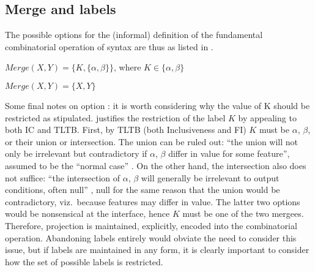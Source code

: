 \subsection{Merge and labels}\label{sec:250}

The possible options for the (informal) definition of the fundamental combinatorial operation of syntax are thus as listed in .

\begin{subexamples}\label{ex:twomerges}
    \item\label{ex:twomerges:label} $Merge(X,Y) = \{K,\{\alpha,\beta\}\}$, where $K\in\{\alpha,\beta\}$
    \item\label{ex:twomerges:nolabel} $Merge(X,Y) = \{X,Y\}$
\end{subexamples}

Some final notes on option : it is worth considering why the value of K should be restricted as stipulated. \textcite[4]{ChomskyN_1994} justifies the restriction of the label $K$ by appealing to both IC and TLTB. First, by TLTB (both Inclusiveness and FI) $K$ must be $\alpha$, $\beta$, or their union or intersection. The union can be ruled out: ``the union will not only be irrelevant but contradictory if $\alpha$, $\beta$ differ in value for some feature'', assumed to be the ``normal case'' \parencite[4]{ChomskyN_1994}. On the other hand, the intersection also does not suffice: ``the intersection of $\alpha$, $\beta$ will generally be irrelevant to output conditions, often null'' \parencite[4]{ChomskyN_1994}, null for the same reason that the union would be contradictory, viz.~because features may differ in value. The latter two options would be nonsensical at the interface, hence $K$ must be one of the two mergees. Therefore, projection is maintained, explicitly, encoded into the combinatorial operation. Abandoning labels entirely would obviate the need to consider this issue, but if labels are maintained in any form, it is clearly important to consider how the set of possible labels is restricted.


